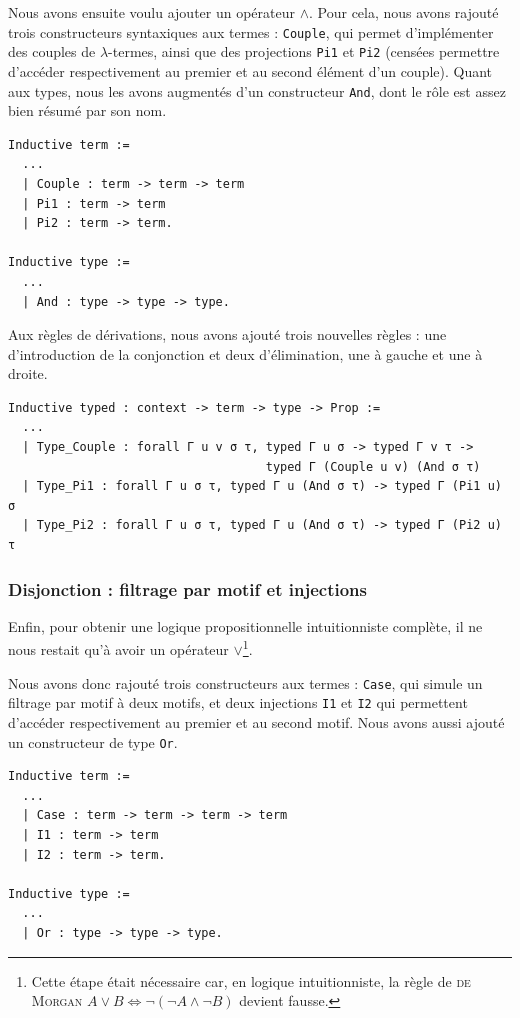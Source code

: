 \documentclass[a4paper]{article}
\theoremstyle{remark}
\theoremstyle{remark}
\theoremstyle{remark}
\theoremstyle{definition}
\theoremstyle{definition}
\theoremstyle{definition}
\begin{document}
Nous avons ensuite voulu ajouter un opérateur $\wedge$. Pour cela, nous avons rajouté trois constructeurs syntaxiques aux termes : \verb+Couple+, qui permet d'implémenter des couples de $\lambda$-termes, ainsi que des projections \verb+Pi1+ et \verb+Pi2+ (censées permettre d'accéder respectivement au premier et au second élément d'un couple). Quant aux types, nous les avons augmentés d'un constructeur \verb+And+, dont le rôle est assez bien résumé par son nom.
\begin{verbatim}
Inductive term :=
  ...
  | Couple : term -> term -> term
  | Pi1 : term -> term
  | Pi2 : term -> term.

Inductive type :=
  ...
  | And : type -> type -> type.
\end{verbatim}

Aux règles de dérivations, nous avons ajouté trois nouvelles règles : une d'introduction de la conjonction et deux d'élimination, une à gauche et une à droite.
\begin{verbatim}
Inductive typed : context -> term -> type -> Prop :=
  ...
  | Type_Couple : forall Γ u v σ τ, typed Γ u σ -> typed Γ v τ ->
                                    typed Γ (Couple u v) (And σ τ)
  | Type_Pi1 : forall Γ u σ τ, typed Γ u (And σ τ) -> typed Γ (Pi1 u) σ
  | Type_Pi2 : forall Γ u σ τ, typed Γ u (And σ τ) -> typed Γ (Pi2 u) τ
\end{verbatim}

\subsubsection{Disjonction : filtrage par motif et injections}

Enfin, pour obtenir une logique propositionnelle intuitionniste complète, il ne nous restait qu'à avoir un opérateur $\vee$\footnote{Cette étape était nécessaire car, en logique intuitionniste, la règle de \textsc{de Morgan} $A \vee B \Leftrightarrow \neg (\neg A \wedge \neg B)$ devient fausse.}.

Nous avons donc rajouté trois constructeurs aux termes : \verb+Case+, qui simule un filtrage par motif à deux motifs, et deux injections \verb+I1+ et \verb+I2+ qui permettent d'accéder respectivement au premier et au second motif. Nous avons aussi ajouté un constructeur de type \verb+Or+.
\begin{verbatim}
Inductive term :=
  ...
  | Case : term -> term -> term -> term
  | I1 : term -> term
  | I2 : term -> term.

Inductive type :=
  ...
  | Or : type -> type -> type.
\end{verbatim}
\end{document}
